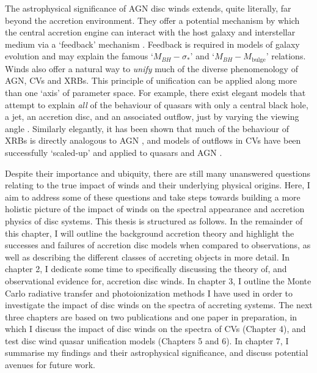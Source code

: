 The astrophysical significance of AGN disc winds extends, quite literally, 
far beyond the accretion environment. They offer a potential mechanism by which the central
accretion engine can interact with the host galaxy and interstellar medium 
via a `feedback' mechanism \citep{king2003,fabian2012}. 
Feedback is required in models of galaxy evolution \citep{springel2005}
and may explain the famous `$M_{BH}-\sigma_*$' \citep{silkrees1998,haring2004}
and `$M_{BH}-M_{\mathrm{bulge}}$' \citep{magorrian1998} relations.
Winds also offer a natural way to {\em unify} much
of the diverse phenomenology of AGN, CVs and XRBs. This principle of unification
can be applied along more than one `axis' of parameter space. For example, 
there exist elegant models that attempt to explain {\em all}
of the behaviour of quasars with only a central black hole, a jet, an accretion disc,
and an associated outflow, just by varying the viewing angle \citep{elvis2000}.
Similarly elegantly, it has been shown that much of the behaviour of XRBs
is directly analogous to AGN \citep{mchardy2006}, 
and models of outflows in CVs have been successfully `scaled-up'
and applied to quasars and AGN \citep[e.g.][]{higginbottom2013}.

Despite their importance and ubiquity, there are still
many unanswered questions relating to the true impact of winds and their underlying
physical origins. Here, I aim to address some of these questions and 
take steps towards building a more holistic picture of the impact
of winds on the spectral appearance and accretion physics of disc systems.
This thesis is structured as follows. In the remainder of this chapter, 
I will outline the background accretion theory 
and highlight the successes and failures of accretion 
disc models when compared to observations,
as well as describing the different classes of accreting objects in more detail. 
In chapter 2, I dedicate some time to specifically discussing the theory of,
and observational evidence for, accretion disc winds. In chapter 3, I outline 
the Monte Carlo radiative transfer and photoionization
methods I have used in order to investigate the impact of disc 
winds on the spectra of accreting systems. The next three chapters
are based on two publications and one paper in preparation, 
in which I discuss the impact
of disc winds on the spectra of CVs (Chapter 4), and test disc wind
quasar unification models (Chapters 5 and 6).
In chapter 7, I summarise my findings and their astrophysical significance, 
and discuss potential avenues for future work.


